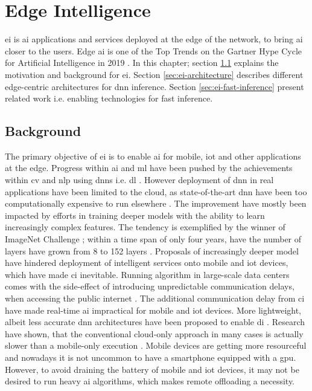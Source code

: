 \hypertarget{Edge Intelligence}{%
	\chapter{Edge Intelligence}\label{ch:edgeintelligence}}

\acrfull{ei} is \gls{ai} applications and services deployed at the edge of the network, to bring \gls{ai} closer to the users. Edge \gls{ai} is one of the Top Trends on the Gartner Hype Cycle for Artificial Intelligence in 2019 \cite{goasduff_top_2019}. In this chapter; section \ref{sec:ei-background} explains the motivation and background for \gls{ei}. Section \ref{sec:ei-architecture} describes different edge-centric architectures for \gls{dnn} inference. Section \ref{sec:ei-fast-inference} present related work i.e. enabling technologies for fast inference.

\section{Background}\label{sec:ei-background}

The primary objective of \gls{ei} is to enable \gls{ai} for mobile, \gls{iot} and other applications at the edge. Progress within \gls{ai} and \gls{ml} have been pushed by the achievements within \gls{cv} and \gls{nlp} using \gls{dnn}s i.e. \gls{dl} \cite{stoica_berkeley_2017}. However deployment of \gls{dnn} in real applications have been limited to the cloud, as state-of-the-art \gls{dnn} have been too computationally expensive to run elsewhere \cite{zhou_edge_2019}. The improvement have mostly been impacted by efforts in training deeper models with the ability to learn increasingly complex features. The tendency is exemplified by the winner of ImageNet Challenge ; within a time span of only four years, have the number of layers have grown from 8 to 152 layers \cite{russakovsky_imagenet_2015}. Proposals of increasingly deeper model have hindered deployment of intelligent services onto mobile and \gls{iot} devices, which have made \gls{ci} inevitable. Running algorithm in large-scale data centers comes with the side-effect of introducing unpredictable communication delays, when accessing the public internet \cite{shi_edge_2016}. The additional communication delay from \gls{ci} have made real-time \gls{ai} impractical for mobile and \gls{iot} devices. More lightweight, albeit less accurate \gls{dnn} architectures have been proposed to enable \gls{di} \cite{chen_deep_2019}. Research have shown, that the conventional cloud-only approach in many cases is actually slower than a mobile-only execution \cite{kang_neurosurgeon:_2017}. Mobile devices are getting more resourceful and nowadays it is not uncommon to have a smartphone equipped with a \gls{gpu}. However, to avoid draining the battery of mobile and \gls{iot} devices, it may not be desired to run heavy \gls{ai} algorithms, which makes remote offloading a necessity. 

